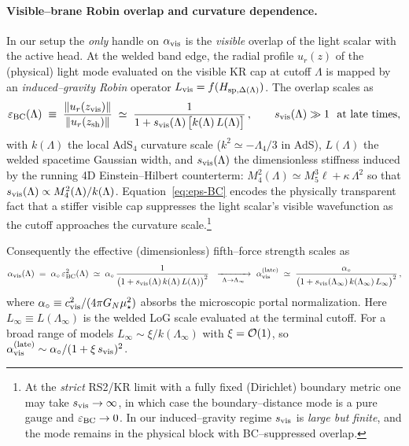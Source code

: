 \documentclass[10pt]{article}
\theoremstyle{definition}
\theoremstyle{plain}
\begin{document}
\paragraph{Visible–brane Robin overlap and curvature dependence.}\label{par:uom-main-103}
In our setup the \emph{only} handle on $\alpha_{\rm vis}$ is the \emph{visible} overlap of the light scalar with the
active head. At the welded band edge, the radial profile $u_r(z)$ of the (physical) light mode evaluated on the visible KR cap at cutoff $\Lambda$ is mapped by an \emph{induced–gravity Robin} operator $L_{\rm vis}=f(H_{{\rm sp},\Delta(\Lambda)})$.
The overlap scales as
\begin{equation}
\varepsilon_{\rm BC}(\Lambda)\;\equiv\;\frac{\|u_r(z_{\rm vis})\|}{\|u_r(z_{\rm sh})\|}\;\simeq\;\frac{1}{1+s_{\rm vis}(\Lambda)\,\big[k(\Lambda)\,L(\Lambda)\big]}\,,
\qquad s_{\rm vis}(\Lambda)\gg1\ {\rm\ at\ late\ times},
\label{eq:eps-BC}
\end{equation}
with $k(\Lambda)$ the local AdS$_4$ curvature scale ($k^2\simeq -\Lambda_4/3$ in AdS),
$L(\Lambda)$ the welded spacetime Gaussian width, and $s_{\rm vis}(\Lambda)$ the dimensionless stiffness induced by the running
4D Einstein--Hilbert counterterm: $M_4^2(\Lambda)\simeq M_5^3\ell+\kappa\,\Lambda^2$ so that $s_{\rm vis}(\Lambda)\propto M_4^2(\Lambda)/k(\Lambda)$.
Equation~\eqref{eq:eps-BC} encodes the physically transparent fact that a stiffer visible cap suppresses the light scalar’s
visible wavefunction as the cutoff approaches the curvature scale.\footnote{At the \emph{strict} RS2/KR limit with a fully fixed (Dirichlet) boundary metric
one may take $s_{\rm vis}\to\infty$, in which case the boundary–distance mode is a pure gauge and $\varepsilon_{\rm BC}\to 0$. In our induced–gravity
regime $s_{\rm vis}$ is \emph{large but finite}, and the mode remains in the physical block with BC–suppressed overlap.}

Consequently the effective (dimensionless) fifth–force strength scales as
\begin{equation}
\alpha_{\rm vis}(\Lambda)\;=\;\alpha_\circ\,\varepsilon_{\rm BC}^2(\Lambda)\;\simeq\;
\alpha_\circ\,\frac{1}{\bigl(1+s_{\rm vis}(\Lambda)\,k(\Lambda)\,L(\Lambda)\bigr)^2}
\ \ \xrightarrow[\ \Lambda\to \Lambda_\infty\ ]{}\
\alpha_{\rm vis}^{\rm (late)}\;\simeq\;\frac{\alpha_\circ}{\bigl(1+s_{\rm vis}(\Lambda_\infty)\,k(\Lambda_\infty)\,L_\infty\bigr)^2}\,,
\label{eq:alpha-vis}
\end{equation}
where $\alpha_\circ\equiv c_{\rm vis}^2/(4\pi G_N\mu_\star^2)$ absorbs the microscopic portal normalization.
Here $L_\infty\equiv L(\Lambda_\infty)$ is the welded LoG scale evaluated at the terminal cutoff. For a broad
range of models $L_\infty\sim \xi/k(\Lambda_\infty)$ with $\xi={\cal O}(1)$, so
\(\alpha_{\rm vis}^{\rm (late)}\sim \alpha_\circ/(1+\xi\,s_{\rm vis})^2\).
\end{document}
